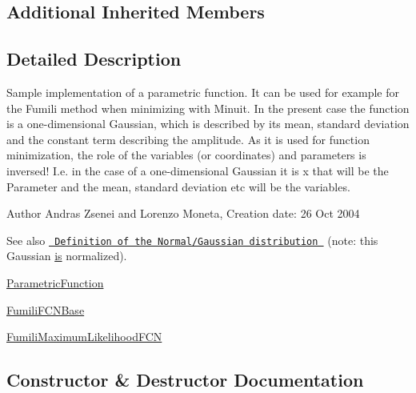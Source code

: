 \subsection*{Additional Inherited Members}


\subsection{Detailed Description}
Sample implementation of a parametric function. It can be used for example for the Fumili method when minimizing with Minuit. In the present case the function is a one-\/dimensional Gaussian, which is described by its mean, standard deviation and the constant term describing the amplitude. As it is used for function minimization, the role of the variables (or coordinates) and parameters is inversed! I.\+e. in the case of a one-\/dimensional Gaussian it is x that will be the Parameter and the mean, standard deviation etc will be the variables.

\begin{DoxyAuthor}{Author}
Andras Zsenei and Lorenzo Moneta, Creation date\+: 26 Oct 2004
\end{DoxyAuthor}
\begin{DoxySeeAlso}{See also}
\href{http://mathworld.wolfram.com/NormalDistribution.html}{\texttt{ Definition of the Normal/\+Gaussian distribution }} (note\+: this Gaussian \mbox{\hyperlink{x_8cc_a81abbbdef81e25584a2eab888e643d3d}{is}} normalized).

\mbox{\hyperlink{classROOT_1_1Minuit2_1_1ParametricFunction}{Parametric\+Function}}

\mbox{\hyperlink{classROOT_1_1Minuit2_1_1FumiliFCNBase}{Fumili\+F\+C\+N\+Base}}

\mbox{\hyperlink{classROOT_1_1Minuit2_1_1FumiliMaximumLikelihoodFCN}{Fumili\+Maximum\+Likelihood\+F\+CN}} 
\end{DoxySeeAlso}


\subsection{Constructor \& Destructor Documentation}
\mbox{\label{classROOT_1_1Minuit2_1_1GaussianModelFunction_aebecd6f3f9e7b6e7d6787f38cfc84cdc}} 
